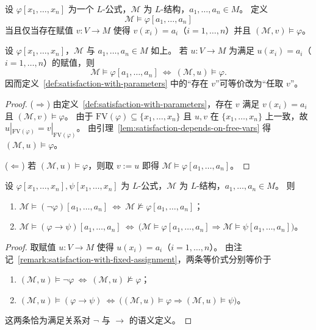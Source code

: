 \documentclass[lang=cn,a4paper,newtx,section]{elegantbook}
\begin{document}
 \begin{definition}[带参数的满足]
 \label{satisfaction-with-parameters}
 设 $\varphi[x_1,\dots,x_n]$ 为一个 $L$-公式，$\mathcal M$ 为 $L$-结构，$a_1,\dots,a_n\in M$。
 定义
 \[
   \mathcal M\models\varphi[a_1,\dots,a_n]
 \]
 当且仅当存在赋值 $v:V\to M$ 使得 $v(x_i)=a_i$（$i=1,\dots,n$）并且 $(\mathcal M,v)\models\varphi$。
 \end{definition}

 \begin{remark}
 \label{remark:satisfaction-with-fixed-assignment}
 设 $\varphi[x_1,\dots,x_n]$，$\mathcal M$ 与 $a_1,\dots,a_n\in M$ 如上。
 若 $u:V\to M$ 为满足 $u(x_i)=a_i$（$i=1,\dots,n$）的赋值，则
 \[
   \mathcal M\models\varphi[a_1,\dots,a_n]\ \Longleftrightarrow\ (\mathcal M,u)\models\varphi.
 \]
 因而定义~\ref{def:satisfaction-with-parameters} 中的“存在 $v$”可等价改为“任取 $v$”。
 \end{remark}

 \begin{proof}
 ($\Rightarrow$) 由定义~\ref{def:satisfaction-with-parameters}，存在 $v$ 满足 $v(x_i)=a_i$ 且 $(\mathcal M,v)\models\varphi$。
 由于 $\mathrm{FV}(\varphi)\subseteq\{x_1,\dots,x_n\}$ 且 $u,v$ 在 $\{x_1,\dots,x_n\}$ 上一致，故 $u|_{\mathrm{FV}(\varphi)}=v|_{\mathrm{FV}(\varphi)}$。
 由引理~\ref{lem:satisfaction-depends-on-free-vars} 得 $(\mathcal M,u)\models\varphi$。

 ($\Leftarrow$) 若 $(\mathcal M,u)\models\varphi$，则取 $v:=u$ 即得 $\mathcal M\models\varphi[a_1,\dots,a_n]$。
 \end{proof}

 \begin{proposition}
 \label{semantics-neg-imp-with-parameters}
 设 $\varphi[x_1,\dots,x_n],\psi[x_1,\dots,x_n]$ 为 $L$-公式，$\mathcal M$ 为 $L$-结构，$a_1,\dots,a_n\in M$。
 则
 \begin{enumerate}
   \item $\mathcal M\models(\neg\varphi)[a_1,\dots,a_n]\ \Longleftrightarrow\ \mathcal M\not\models\varphi[a_1,\dots,a_n]$；
   \item $\mathcal M\models(\varphi\to\psi)[a_1,\dots,a_n]\ \Longleftrightarrow\ \bigl(\mathcal M\models\varphi[a_1,\dots,a_n]\Rightarrow\mathcal M\models\psi[a_1,\dots,a_n]\bigr)$。
 \end{enumerate}
 \end{proposition}

 \begin{proof}
 取赋值 $u:V\to M$ 使得 $u(x_i)=a_i$（$i=1,\dots,n$）。
 由注记~\ref{remark:satisfaction-with-fixed-assignment}，两条等价式分别等价于
 \begin{enumerate}
   \item $(\mathcal M,u)\models\neg\varphi\ \Longleftrightarrow\ (\mathcal M,u)\not\models\varphi$；
   \item $(\mathcal M,u)\models(\varphi\to\psi)\ \Longleftrightarrow\ \bigl((\mathcal M,u)\models\varphi\Rightarrow(\mathcal M,u)\models\psi\bigr)$。
 \end{enumerate}
 这两条恰为满足关系对 $\neg$ 与 $\to$ 的语义定义。
 \end{proof}
\end{document}
